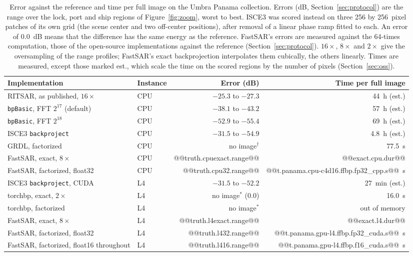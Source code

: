\documentclass[11pt]{article}
\begin{document}
\begin{table}[tbp]
\centering
\caption{Error against the reference and time per full image on the Umbra Panama collection. Errors (dB, Section~\ref{sec:protocol}) are the range over the lock, port and ship regions of Figure~\ref{fig:zoom}, worst to best. ISCE3 was scored instead on three 256 by 256~pixel patches of its own grid (the scene center and two off-center positions), after removal of a linear phase ramp fitted to each. An error of 0.0~dB means that the difference has the same energy as the reference. FastSAR's errors are measured against the 64-times computation, those of the open-source implementations against the reference (Section~\ref{sec:protocol}). $16\times$, $8\times$ and $2\times$ give the oversampling of the range profiles; FastSAR's exact backprojection interpolates them cubically, the others linearly. Times are measured, except those marked est., which scale the time on the scored regions by the number of pixels (Section~\ref{sec:oss}).}
\label{tab:oss}
\small
\begin{tabular}{llrr}
\toprule
Implementation & Instance & Error (dB) & Time per full image \\
\midrule
RITSAR, as published, $16\times$ & CPU & $-25.3$ to $-27.3$ & 44~h (est.) \\
\texttt{bpBasic}, FFT $2^{17}$ (default) & CPU & $-38.1$ to $-43.2$ & 57~h (est.) \\
\texttt{bpBasic}, FFT $2^{18}$ & CPU & $-52.9$ to $-55.4$ & 69~h (est.) \\
ISCE3 \texttt{backproject} & CPU & $-31.5$ to $-54.9$ & 4.8~h (est.) \\
GRDL, factorized & CPU & no image$^\dagger$ & 77.5~s \\
FastSAR, exact, $8\times$ & CPU & @@truth.cpuexact.range@@ & @@exact.cpu.dur@@ \\
FastSAR, factorized, float32 & CPU & @@truth.cpu32.range@@ & @@t.panama.cpu-c4d16.ffbp.fp32_cpp.s@@~s \\
\midrule
ISCE3 \texttt{backproject}, CUDA & L4 & $-31.5$ to $-52.2$ & 27~min (est.) \\
torchbp, exact, $2\times$ & L4 & no image$^*$ ($0.0$) & 16.0~s \\
torchbp, factorized & L4 & no image$^*$ & out of memory \\
FastSAR, exact, $8\times$ & L4 & @@truth.l4exact.range@@ & @@exact.l4.dur@@ \\
FastSAR, factorized, float32 & L4 & @@truth.l432.range@@ & @@t.panama.gpu-l4.ffbp.fp32_cuda.s@@~s \\
FastSAR, factorized, float16 throughout & L4 & @@truth.l416.range@@ & @@t.panama.gpu-l4.ffbp.f16_cuda.s@@~s \\
\bottomrule
\end{tabular}


\end{table}
\end{document}
